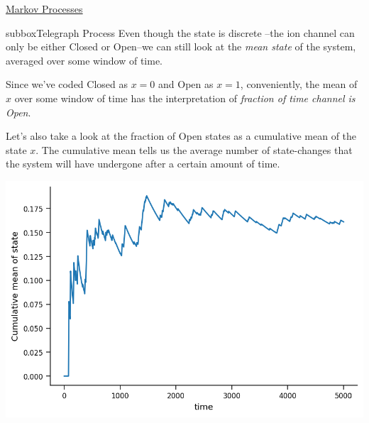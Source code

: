 \begin{textbox}{\href{https://colab.research.google.com/github/NeuromatchAcademy/course-content/blob/master/tutorials/W2D2_LinearSystems/student/W2D2_Tutorial2.ipynb}{Markov Processes } }
\begin{subbox}{subbox}{Telegraph Process}
Even though the state is discrete --the ion channel can only be either Closed or Open--we can still look at the \textit{mean state} of the system, averaged over some window of time. 

Since we've coded Closed as $x=0$ and Open as $x=1$, conveniently, the mean of $x$ over some window of time has the interpretation of \textit{fraction of time channel is Open}.

Let's also take a look at the fraction of Open states as a cumulative mean of the state $x$. The cumulative mean tells us the average number of state-changes that the system will have undergone after a certain amount of time. 

\begin{center}
\includegraphics[scale=0.32]{Figures/LS/MC_Figure4.png}
\end{center}
\end{subbox}
\end{textbox}
